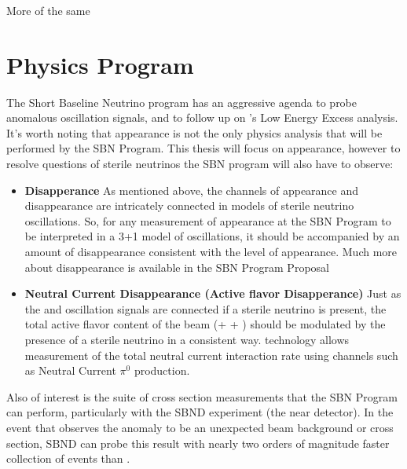 \subsubsection{\icarus}

More of the same

\section{Physics Program}

The Short Baseline Neutrino program has an aggressive agenda to probe anomalous oscillation signals, and to follow up on \uboone's Low Energy Excess analysis.  It's worth noting that \nue appearance is not the only physics analysis that will be performed by the SBN Program.  This thesis will focus on \nue appearance, however to resolve questions of sterile neutrinos the SBN program will also have to observe:

\begin{itemize}

\item {\bf \numu Disapperance}  As mentioned above, the channels of \nue appearance and \numu disappearance are intricately connected in models of sterile neutrino oscillations.  So, for any measurement of \nue appearance at the SBN Program to be interpreted in a 3+1 model of oscillations, it should be accompanied by an amount of \numu disappearance consistent with the level of \nue appearance.  Much more about \numu disappearance is available in the SBN Program Proposal \cite{Antonello:2015lea} 

\item {\bf Neutral Current Disappearance (Active flavor Disapperance)}  Just as the \nue and \numu oscillation signals are connected if a sterile neutrino is present, the total active flavor content of the beam (\nue + \numu + \nutau) should be modulated by the presence of a sterile neutrino in a consistent way.  \lartpc technology allows measurement of the total neutral current interaction rate using channels such as Neutral Current $\pi^0$ production.

\end{itemize}

Also of interest is the suite of cross section measurements that the SBN Program can perform, particularly with the SBND experiment (the near detector).  In the event that \uboone observes the \MB anomaly to be an unexpected beam background or cross section, SBND can probe this result with nearly two orders of magnitude faster collection of events than \uboone.

